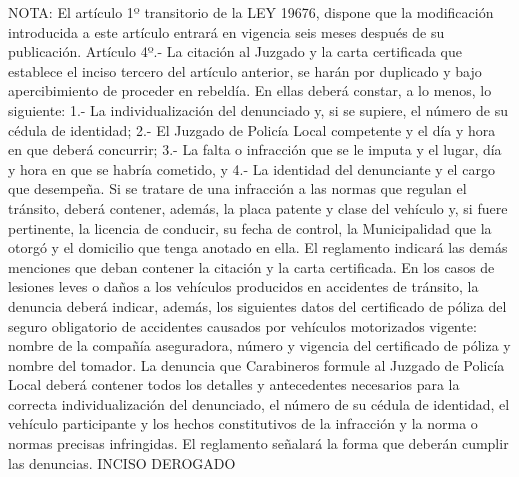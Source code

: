 NOTA:
    El artículo 1º transitorio de la LEY 19676, dispone que la modificación introducida a este artículo entrará en vigencia seis meses después de su publicación.
    Artículo 4º.- La citación al Juzgado y la carta certificada que establece el inciso tercero del artículo anterior, se harán por duplicado y bajo apercibimiento de proceder en rebeldía. En ellas deberá constar, a lo menos, lo siguiente:
    1.- La individualización del denunciado y, si se supiere, el número de su cédula de identidad;
    2.-  El Juzgado de Policía Local competente y el día y hora en que deberá concurrir;
    3.- La falta o infracción que se le imputa y el lugar, día y hora en que se habría cometido, y 4.- La identidad del denunciante y el cargo que desempeña.
    Si se tratare de una infracción a las normas que regulan el tránsito, deberá contener, además, la placa patente y clase del vehículo y, si fuere pertinente, la licencia de conducir, su fecha de control, la Municipalidad que la otorgó y el domicilio que tenga anotado en ella.
    El reglamento indicará las demás menciones que deban contener la citación y la carta certificada.
    En los casos de lesiones leves o daños a los vehículos producidos en accidentes de tránsito, la denuncia deberá indicar, además, los siguientes datos del certificado de póliza del seguro obligatorio de accidentes causados por vehículos motorizados vigente: nombre de la compañía aseguradora, número y vigencia del certificado de póliza y nombre del tomador.
    La denuncia que Carabineros formule al Juzgado de Policía Local deberá contener todos los detalles y antecedentes necesarios para la correcta individualización del denunciado, el número de su cédula de identidad, el vehículo participante y los hechos constitutivos de la infracción y la norma o normas precisas infringidas. El reglamento señalará la forma que deberán cumplir las denuncias.
    INCISO DEROGADO

